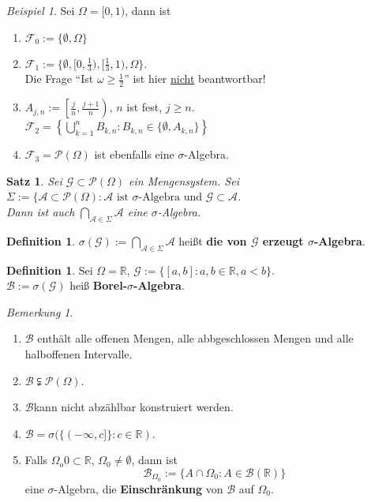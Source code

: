 \documentclass[10pt,a4paper]{article}
\newcommand{\R}{\ensuremath{\mathbb{R}}}
\newcommand{\Potset}{\mathscr P}
\theoremstyle{plain}
\newtheorem{satz}[theorem]{Satz}
\theoremstyle{definition}
\newtheorem{definition}[theorem]{Definition}
\theoremstyle{remark}
\newtheorem{bem}[theorem]{Bemerkung}
\newtheorem{exm}[theorem]{Beispiel}
\begin{document}
	\begin{exm}
		Sei $\Omega=[0,1)$, dann ist \begin{enumerate}
			\item $\mathscr F_0:=\{\emptyset,\Omega\}$
			\item $\mathscr F_1:=\{\emptyset,[0,\frac{1}{3}),[\frac{1}{3},1),\Omega\}$.\\
			Die Frage ``Ist $\omega\ge \frac{1}{2}$'' ist hier \underline{nicht} beantwortbar!
			\item $A_{j,n}:=\left[\frac{j}{n},\frac{j+1}{n}\right)$, $n$ ist fest, $j\ge n$.\\
			$\mathscr F_2=\left\{\bigcup_{k=1}^{n}B_{k,n}:B_{k,n}\in\{\emptyset,A_{k,n}\}\right\}$
			\item $\mathscr F_3=\Potset(\Omega)$ ist ebenfalls eine $\sigma$-Algebra.
		\end{enumerate}
	\end{exm}
	
	\begin{satz}
		Sei $\mathscr G\subset\Potset(\Omega)$ ein Mengensystem. Sei $\Sigma:=\{\mathscr A\subset \Potset(\Omega):\text{$\mathscr A$ ist $\sigma$-Algebra und $\mathscr G\subset\mathscr A$}$.\\
		Dann ist auch $\bigcap_{\mathscr A\in\Sigma}\mathscr A$ eine $\sigma$-Algebra.
	\end{satz}
	\addtocounter{theorem}{-1}
	\begin{definition}
		$\sigma(\mathscr G):= \bigcap_{\mathscr A\in\Sigma}\mathscr A$ heißt \textbf{die von $\mathscr G$ erzeugt $\sigma$-Algebra}.
	\end{definition}

	\begin{definition}
		Sei $\Omega=\R$, $\mathscr G:=\{[a,b]:a,b\in\R,a<b\}$.\\
		$\mathscr B:=\sigma(\mathscr G)$ heiß \textbf{Borel-$\sigma$-Algebra}.
	\end{definition}

	\begin{bem}
		\begin{enumerate}
			\item $\mathscr B$ enthält alle offenen Mengen, alle abbgeschlossen Mengen und alle halboffenen Intervalle.
			\item $\mathscr B\subsetneqq \Potset (\Omega)$.
			\item $\mathscr B$kann nicht abzählbar konstruiert werden.
			\item $\mathscr B=\sigma(\{(-\infty,c]\}:c\in\R)$.
			\item Falls $\Omega_o
			0\subset\R$, $\Omega_0\neq \emptyset$, dann ist
			\[\mathscr B_{\Omega_0}:=\{ A\cap\Omega_0:A\in \mathscr B(\R)\}\]
		eine $\sigma$-Algebra, die \textbf{Einschränkung} von $\mathscr B$ auf $\Omega_0$.
		\end{enumerate}
	\end{bem}
\end{document}
